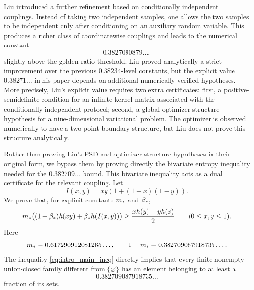 Liu \cite{Liu2023} introduced a further refinement based on conditionally
independent couplings.  Instead of taking two independent samples, one allows
the two samples to be independent only after conditioning on an auxiliary
random variable.  This produces a richer class of coordinatewise couplings and
leads to the numerical constant
\begin{equation}
  0.3827090879\ldots,
\end{equation}
slightly above the golden-ratio threshold.  Liu proved analytically a strict
improvement over the previous \(0.38234\)-level constants, but the explicit
value \(0.38271\ldots\) in his paper depends on additional numerically verified
hypotheses.  More precisely, Liu's explicit value requires two extra
certificates: first, a positive-semidefinite condition for an infinite kernel
matrix associated with the conditionally independent protocol; second, a
global optimizer-structure hypothesis for a nine-dimensional variational
problem.  The optimizer is observed numerically to have a two-point boundary
structure, but Liu does not prove this structure analytically.

Rather than proving Liu's PSD and optimizer-structure hypotheses in their
original form, we bypass them by proving directly the bivariate entropy
inequality needed for the \(0.382709\ldots\) bound.  This bivariate inequality
acts as a dual certificate for the relevant coupling.  Let
\begin{equation}
  I(x,y)=xy(1+(1-x)(1-y)).
\end{equation}
We prove that, for explicit constants \(m_*\) and \(\beta_*\),
\begin{equation}\label{eq:intro_main_ineq}
  m_*\bigl((1-\beta_*)h(xy)+\beta_* h(I(x,y))\bigr)
  \ge
  \frac{x h(y)+y h(x)}2
  \qquad (0\le x,y\le1).
\end{equation}
Here
\begin{equation}
  m_*=0.617290912081265\ldots,
  \qquad
  1-m_*=0.382709087918735\ldots .
\end{equation}
The inequality \eqref{eq:intro_main_ineq} directly implies that every finite
nonempty union-closed family different from \(\{\varnothing\}\) has an element
belonging to at least a
\begin{equation}
  0.382709087918735\ldots
\end{equation}
fraction of its sets.

